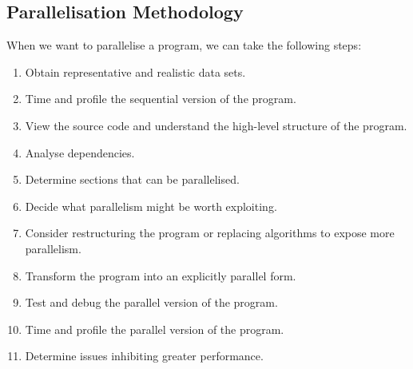 \documentclass{article}
\begin{document}
\subsection{Parallelisation Methodology}
When we want to parallelise a program, we can take the following steps:
\begin{enumerate}
    \item Obtain representative and realistic data sets.
    \item Time and profile the sequential version of the program.
    \item View the source code and understand the high-level structure
          of the program.
    \item Analyse dependencies.
    \item Determine sections that can be parallelised.
    \item Decide what parallelism might be worth exploiting.
    \item Consider restructuring the program or replacing algorithms to
          expose more parallelism.
    \item Transform the program into an explicitly parallel form.
    \item Test and debug the parallel version of the program.
    \item Time and profile the parallel version of the program.
    \item Determine issues inhibiting greater performance.
\end{enumerate}
\end{document}
